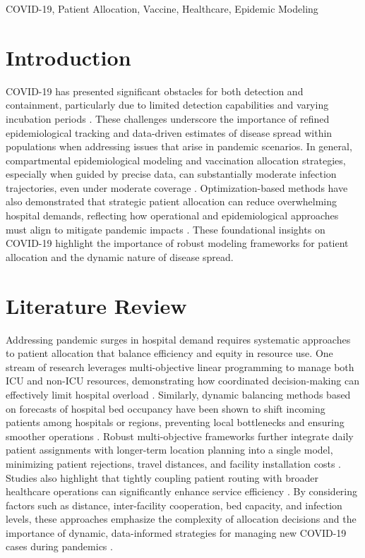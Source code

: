 \documentclass{article}
\begin{document}
  \begin{ieomkeywords}
    COVID-19, Patient Allocation, Vaccine, Healthcare, Epidemic Modeling
  \end{ieomkeywords}

\section{Introduction}
COVID-19 has presented significant obstacles for both detection and containment, particularly due to limited detection capabilities and varying incubation periods \parencite{li2020modeling, lauer2020incubation, meyerowitz2020systematic}. These challenges underscore the importance of refined epidemiological tracking and data-driven estimates of disease spread within populations when addressing issues that arise in pandemic scenarios. In general, compartmental epidemiological modeling and vaccination allocation strategies, especially when guided by precise data, can substantially moderate infection trajectories, even under moderate coverage \parencite{waseel2024assessing}. Optimization-based methods have also demonstrated that strategic patient allocation can reduce overwhelming hospital demands, reflecting how operational and epidemiological approaches must align to mitigate pandemic impacts \parencite{sarkar2021covid}. These foundational insights on COVID-19 highlight the importance of robust modeling frameworks for patient allocation and the dynamic nature of disease spread.

\section{Literature Review}
Addressing pandemic surges in hospital demand requires systematic approaches to patient allocation that balance efficiency and equity in resource use. One stream of research leverages multi-objective linear programming to manage both ICU and non-ICU resources, demonstrating how coordinated decision-making can effectively limit hospital overload \parencite{aydin2022analyses}. Similarly, dynamic balancing methods based on forecasts of hospital bed occupancy have been shown to shift incoming patients among hospitals or regions, preventing local bottlenecks and ensuring smoother operations \parencite{dijkstra2023dynamic}. Robust multi-objective frameworks further integrate daily patient assignments with longer-term location planning into a single model, minimizing patient rejections, travel distances, and facility installation costs \parencite{eriskin2024robust}. Studies also highlight that tightly coupling patient routing with broader healthcare operations can significantly enhance service efficiency \parencite{yinusa2023optimizing, shi2023data}. By considering factors such as distance, inter-facility cooperation, bed capacity, and infection levels, these approaches emphasize the complexity of allocation decisions and the importance of dynamic, data-informed strategies for managing new COVID-19 cases during pandemics \parencite{sarkar2021covid}.
\end{document}
